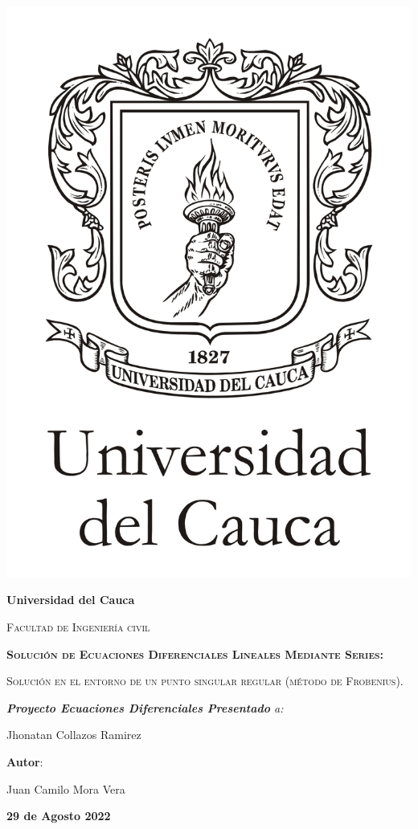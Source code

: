 \documentclass{article}
\begin{document}
\begin{titlepage}
\begin{center}
\includegraphics[scale=0.3]{Unicauca.jpg} 

\vspace{1cm}
{\bfseries\LARGE Universidad del Cauca\par}
\vspace{1cm}
{\scshape\Large Facultad de Ingenier\'ia civil \par}
\vspace{2cm}
{\scshape\LARGE \textbf{Soluci\'on de Ecuaciones Diferenciales Lineales Mediante Series:} \par}
{\scshape\large Soluci\'on en el entorno de un punto singular regular (m\'etodo de Frobenius).  \par}
\vspace{2cm}
{\itshape\Large \textbf{Proyecto Ecuaciones Diferenciales Presentado} a: \par}
{\Large Jhonatan Collazos Ramirez\par}
\vfill
{\Large\textbf{ Autor}: \par}
{\Large Juan Camilo Mora Vera \par}
\vfill
{\Large \textbf{29 de Agosto 2022}\newpage}
\end{center}

\end{titlepage}
\end{document}
